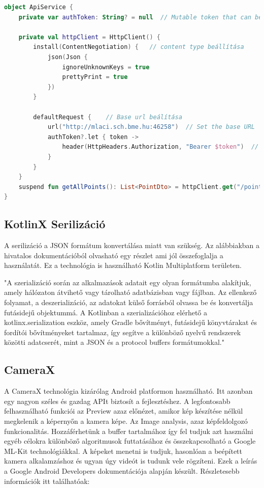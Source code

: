 \begin{lstlisting}[caption={Példa a Ktor használatára.}, label={lst:ktor}, language=Kotlin]
object ApiService {
    private var authToken: String? = null  // Mutable token that can be updated at runtime

    private val httpClient = HttpClient() {
        install(ContentNegotiation) {   // content type beállítása
            json(Json {
                ignoreUnknownKeys = true
                prettyPrint = true
            })
        }

        defaultRequest {    // Base url beálítása
            url("http://mlaci.sch.bme.hu:46258")  // Set the base URL   152.66.182.70:46258   192.168.1.17:46258
            authToken?.let { token ->
                header(HttpHeaders.Authorization, "Bearer $token")  // Add the Bearer token if it's not null
            }
        }
    }
    suspend fun getAllPoints(): List<PointDto> = httpClient.get("/point").body()    //végpontok
}
\end{lstlisting}

\subsection{KotlinX Serilizáció}
\label{sec:KotlinX}

A serilizáció a JSON formátum konvertálása miatt van szükség. Az alábbiakban a hivatalos dokumentációból olvasható egy részlet ami jól összefoglalja a használatát.
Ez a technológia is használható Kotlin Multiplatform területen.

"A szerializáció során az alkalmazások adatait egy olyan formátumba alakítjuk, amely hálózaton átvihető vagy tárolható adatbázisban vagy fájlban. Az ellenkező folyamat, a deszerializáció, az adatokat külső forrásból olvassa be és konvertálja futásidejű objektummá. A Kotlinban a szerializációhoz elérhető a kotlinx.serialization eszköz, amely Gradle bővítményt, futásidejű könyvtárakat és fordítói bővítményeket tartalmaz, így segítve a különböző nyelvű rendszerek közötti adatcserét, mint a JSON és a protocol buffers formátumokkal."\cite{Serialization}

\subsection{CameraX}

A CameraX technológia kizárólag Android platformon használható.
Itt azonban egy nagyon széles és gazdag APIt biztosít a fejlesztéshez.
A legfontosabb felhasználható funkciói az Preview azaz előnézet, amikor kép készítése nélkül megkelenik a képernyőn a kamera képe.
Az Image analysis, azaz képfeldolgozó funkcionalitás. Hozzáférhetünk a buffer tartalmához így fel tudjuk azt használni egyéb célokra különböző algoritmusok futtatásához és összekapcsolható a Google ML-Kit technológiákkal. 
A képeket menetni is tudjuk, hasonlóan a beépített kamera alkalamzáshoz és ugyan úgy videót is tudunk vele rögzíteni.
Ezek a leírás a Google Android Developers dokumentációja alapján készült. Részletesebb információk itt találhatóak: \cite{CameraX}

